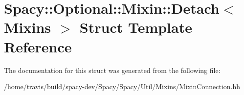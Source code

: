 \hypertarget{structSpacy_1_1Optional_1_1Mixin_1_1Detach}{\section{Spacy\-:\-:Optional\-:\-:Mixin\-:\-:Detach$<$ Mixins $>$ Struct Template Reference}
\label{structSpacy_1_1Optional_1_1Mixin_1_1Detach}
}


The documentation for this struct was generated from the following file\-:\begin{DoxyCompactItemize}
\item 
/home/travis/build/spacy-\/dev/\-Spacy/\-Spacy/\-Util/\-Mixins/Mixin\-Connection.\-hh\end{DoxyCompactItemize}
